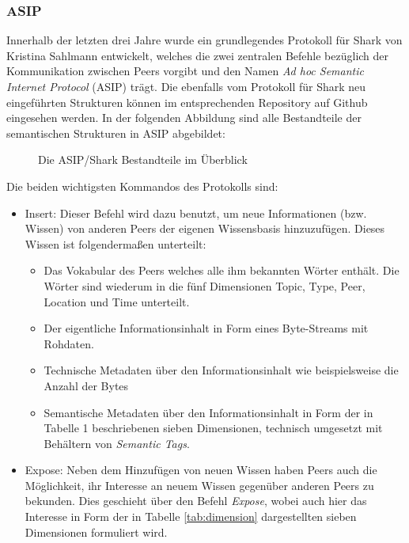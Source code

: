 \subsubsection{ASIP}
Innerhalb der letzten drei Jahre wurde ein grundlegendes Protokoll für Shark von Kristina Sahlmann entwickelt, welches die zwei zentralen Befehle bezüglich der Kommunikation zwischen Peers vorgibt und den Namen \textit{Ad hoc Semantic Internet Protocol} (ASIP) trägt. Die ebenfalls vom Protokoll für Shark neu eingeführten Strukturen können im entsprechenden Repository auf Github eingesehen werden. In der folgenden Abbildung sind alle Bestandteile der semantischen Strukturen in ASIP abgebildet:\newpage
\vspace*{-4.5em}
\begin{figure}[H]
	\centering
	\caption{Die ASIP/Shark Bestandteile im Überblick}
	\label{fig:knowledge}
\end{figure}
Die beiden wichtigsten Kommandos des Protokolls sind:
\begin{itemize}
	\item Insert: Dieser Befehl wird dazu benutzt, um neue Informationen (bzw. Wissen) von anderen Peers der eigenen Wissensbasis hinzuzufügen. Dieses Wissen ist folgendermaßen unterteilt:
	\begin{itemize}
		\item Das Vokabular des Peers welches alle ihm bekannten Wörter enthält. Die Wörter sind wiederum in die fünf Dimensionen Topic, Type, Peer, Location und Time unterteilt.
		\item Der eigentliche Informationsinhalt in Form eines Byte-Streams mit Rohdaten.
		\item Technische Metadaten über den Informationsinhalt wie beispielsweise die Anzahl der Bytes
		\item Semantische Metadaten über den Informationsinhalt in Form der in Tabelle 1 beschriebenen sieben Dimensionen, technisch umgesetzt mit Behältern von \textit{Semantic Tags}.		
	\end{itemize} 
	\item Expose: Neben dem Hinzufügen von neuen Wissen haben Peers auch die Möglichkeit, ihr Interesse an neuem Wissen gegenüber anderen Peers zu bekunden. Dies geschieht über den Befehl \textit{Expose}, wobei auch hier das Interesse in Form der in Tabelle \ref{tab:dimension} dargestellten sieben Dimensionen formuliert wird.
\end{itemize}
